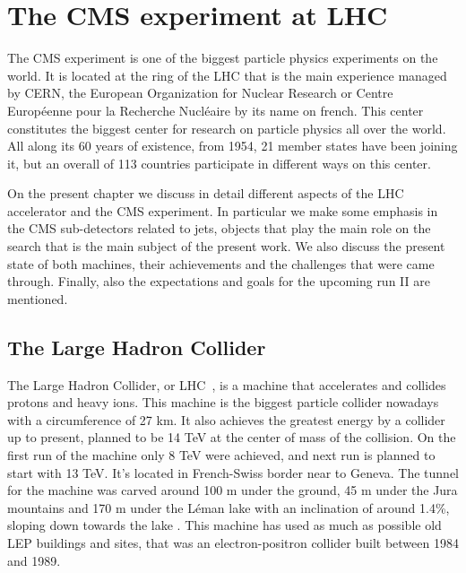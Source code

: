 \chapter[The CMS experiment at LHC]{The CMS experiment at LHC}

The CMS experiment is one of the biggest particle physics experiments on the world. It is located at the ring of the LHC that is the main experience managed by CERN, the European Organization for Nuclear Research or Centre Europ\'{e}enne pour la Recherche Nucl\'{e}aire by its name on french. This center constitutes the biggest center for research on particle physics all over the world. All along its 60 years of existence, from 1954, 21 member states have been joining it, but an overall of 113 countries participate in different ways on this center. 

On the present chapter we discuss in detail different aspects of the LHC accelerator and the CMS experiment. In particular we make some emphasis in the CMS sub-detectors related to jets, objects that play the main role on the search that is the main subject of the present work. We also discuss the present state of both machines, their achievements and the challenges that were came through. Finally, also the expectations and goals for the upcoming run II are mentioned.  

\section{The Large Hadron Collider}
\label{sec:LHC}

The Large Hadron Collider, or LHC~\cite{Bruning:782076}, is a machine that accelerates and collides protons and heavy ions. This machine is the biggest particle collider nowadays with a circumference of 27 km. It also achieves the greatest energy by a collider up to present, planned to be 14 TeV at the center of mass of the collision. On the first run of the machine only 8 TeV were achieved, and next run is planned to start with 13 TeV. It's located in French-Swiss border near to Geneva. The tunnel for the machine was carved around 100 m under the ground, 45 m under the Jura mountains and 170 m under the L\'{e}man lake with an inclination of around 1.4\%, sloping down towards the lake . This machine has used as much as possible old LEP buildings and sites, that was an electron-positron collider built between 1984 and 1989. 

